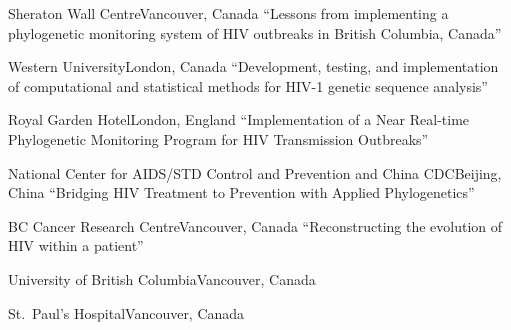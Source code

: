 {Sheraton Wall Centre}{Vancouver, Canada}
{``Lessons from implementing a phylogenetic monitoring system of HIV outbreaks in British Columbia, Canada''}

{Western University}{London, Canada}
{``Development, testing, and implementation of computational and statistical methods for HIV-1 genetic sequence analysis''}

{Royal Garden Hotel}{London, England}
{``Implementation of a Near Real-time Phylogenetic Monitoring Program for HIV Transmission Outbreaks''}

{National Center for AIDS/STD Control and Prevention and China CDC}{Beijing, China}
{``Bridging HIV Treatment to Prevention with Applied Phylogenetics''}

{BC Cancer Research Centre}{Vancouver, Canada}
{``Reconstructing the evolution of HIV within a patient''}

{University of British Columbia}{Vancouver, Canada}
{}

{St.~Paul's Hospital}{Vancouver, Canada}
{}


